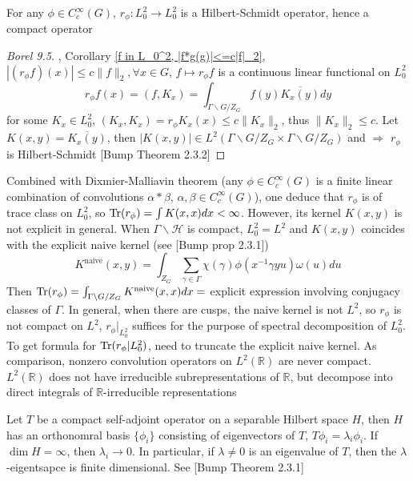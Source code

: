 \documentclass[../main.tex]{subfiles}
\begin{document}
\begin{proposition}\label{r_phi:L_0^2->L_0^2 is Hilbert-Schmidt}
For any $\phi\in C^\infty_c(G)$, $r_\phi:L_0^2\to L_0^2$ is a Hilbert-Schmidt operator, hence a compact operator
\end{proposition}

\begin{proof}
[Borel 9.5], Corollary \ref{f in L_0^2, |f*g(g)|<=c|f|_2}, $|(r_\phi f)(x)|\leq c\|f\|_2,\forall x\in G$, $f\mapsto r_\phi f$ is a continuous linear functional on $L^2_0$
\[r_\phi f(x)=(f,K_x)=\int_{\Gamma\backslash G/Z_G}f(y)\overline{K_x(y)}dy\]
for some $K_x\in L_0^2$, $(K_x,K_x)=r_\phi K_x(x)\leq c\|K_x\|_2$, thus $\|K_x\|_2\leq c$. Let $K(x,y)=\overline{K_x(y)}$, then $|K(x,y)|\in L^2(\Gamma\backslash G/Z_G\times \Gamma\backslash G/Z_G)$ and 
$\Rightarrow$ $r_\phi$ is Hilbert-Schmidt [Bump Theorem 2.3.2]
\end{proof}

\begin{remark}
Combined with Dixmier-Malliavin theorem (any $\phi\in C_c^\infty(G)$ is a finite linear combination of convolutions $\alpha*\beta$, $\alpha,\beta\in C_c^\infty(G)$), one deduce that $r_\phi$ is of trace class on $L_0^2$, so $\operatorname{Tr}(r_\phi)=\int K(x,x)dx<\infty$. However, its kernel $K(x,y)$ is not explicit in general. When $\Gamma\backslash\mathcal H$ is compact, $L_0^2=L^2$ and $K(x,y)$ coincides with the explicit naive kernel (see [Bump prop 2.3.1])
\[K^{\text{naive}}(x,y)=\int_{Z_G}\sum_{\gamma\in\Gamma}\chi(\gamma)\phi(x^{-1}\gamma yu)\omega(u)du\]
Then $\operatorname{Tr}(r_\phi)=\int_{\Gamma\backslash G/Z_G}K^{\text{naive}}(x,x)dx=$ explicit expression involving conjugacy classes of $\Gamma$. In general, when there are cusps, the naive kernel is not $L^2$, so $r_\phi$ is not compact on $L^2$, $r_\phi|_{L^2_0}$ suffices for the purpose of spectral decomposition of $L_0^2$. To get formula for $\operatorname{Tr}(r_\phi|L_0^2)$, need to truncate the explicit naive kernel. As comparison, nonzero convolution operators on $L^2(\mathbb R)$ are never compact. $L^2(\mathbb R)$ does not have irreducible subrepresentations of $\mathbb R$, but decompose into direct integrals of $\mathbb R$-irreducible representations
\end{remark}

\begin{theorem}\label{Theorem on compact operators on Hilbert spaces}
Let $T$ be a compact self-adjoint operator on a separable Hilbert space $H$, then $H$ has an orthonomral basis $\{\phi_i\}$ consisting of eigenvectors of $T$, $T\phi_i=\lambda_i\phi_i$. If $\dim H=\infty$, then $\lambda_i\to0$. In particular, if $\lambda\neq0$ is an eigenvalue of $T$, then the $\lambda$-eigentsapce is finite dimensional. See [Bump Theorem 2.3.1]
\end{theorem}
\end{document}
